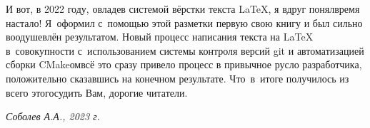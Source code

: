 {И вот, в 2022 году, овладев системой вёрстки текста \LaTeX{}, я вдруг понял\mdash время настало! Я~оформил с~помощью этой разметки первую свою книгу и был сильно воодушевлён результатом. Новый процесс написания текста на \LaTeX{} в~совокупности с~использованием системы контроля версий git и автоматизацией сборки CMake\sdash ом\mdash всё это сразу привело процесс в привычное русло разработчика, положительно сказавшись на конечном результате. Что~в~итоге получилось из всего этого\mdash судить Вам, дорогие читатели.

\vspace{5mm}
\begin{flushright}
	\textit{Соболев А.А., 2023 г.}
\end{flushright}

}
\fancyhead[LE]{\fancyplain{}{\bfseries \parttitle}}
\fancyhead[RO]{\fancyplain{}{\bfseries \rightmark}}